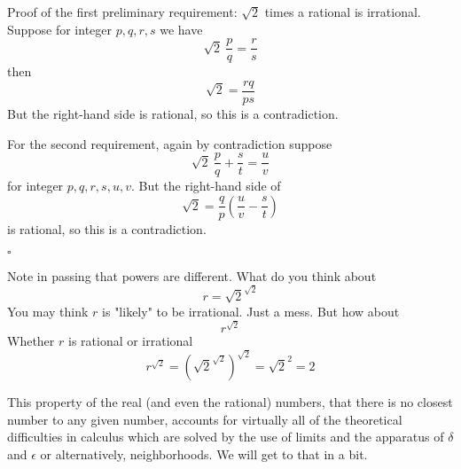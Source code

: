 \documentclass[11pt, oneside]{article}
\begin{document}
Proof of the first preliminary requirement:  $\sqrt{2}$ times a rational is irrational.  Suppose for integer $p, q, r, s$ we have
\[ \sqrt{2} \ \frac{p}{q} = \frac{r}{s} \]
then
\[ \sqrt{2} = \frac{rq}{ps} \]
But the right-hand side is rational, so this is a contradiction.

For the second requirement, again by contradiction suppose
\[ \sqrt{2} \ \frac{p}{q} +  \frac{s}{t} = \frac{u}{v} \]
for integer $p, q, r, s, u, v$.  But the right-hand side of
\[ \sqrt{2} = \frac{q}{p} ( \frac{u}{v} - \frac{s}{t}) \]
is rational, so this is a contradiction.

$\square$

Note in passing that powers are different.  What do you think about
\[ r = \sqrt{2}^{\sqrt{2}} \]
You may think $r$ is "likely" to be irrational.  Just a mess.  But how about
\[ r^{\sqrt{2}} \]
Whether $r$ is rational or irrational
\[ r^{\sqrt{2}} = (\sqrt{2}^{\sqrt{2}})^{\sqrt{2}} = \sqrt{2}^2 = 2 \]


This property of the real (and even the rational) numbers, that there is no closest number to any given number, accounts for virtually all of the theoretical difficulties in calculus which are solved by the use of limits and the apparatus of $\delta$ and $\epsilon$ or alternatively, neighborhoods.  We will get to that in a bit.
\end{document}
